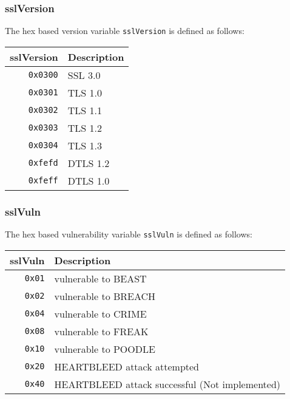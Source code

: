 \documentclass[documentation]{subfiles}
\begin{document}
\subsubsection{sslVersion}\label{sslVersion}
The hex based version variable {\tt sslVersion} is defined as follows:
\begin{longtable}{rl}
    \toprule
    {\bf sslVersion} & {\bf Description} \\
    \midrule\endhead%
    {\tt 0x0300} & SSL 3.0\\
    {\tt 0x0301} & TLS 1.0\\
    {\tt 0x0302} & TLS 1.1\\
    {\tt 0x0303} & TLS 1.2\\
    {\tt 0x0304} & TLS 1.3\\
    {\tt 0xfefd} & DTLS 1.2\\
    {\tt 0xfeff} & DTLS 1.0\\
    \bottomrule
\end{longtable}

\subsubsection{sslVuln}\label{sslVuln}
The hex based vulnerability variable {\tt sslVuln} is defined as follows:
\begin{longtable}{rl}
    \toprule
    {\bf sslVuln} & {\bf Description} \\
    \midrule\endhead%
    {\tt 0x01} & vulnerable to BEAST\\
    {\tt 0x02} & vulnerable to BREACH\\
    {\tt 0x04} & vulnerable to CRIME\\
    {\tt 0x08} & vulnerable to FREAK\\
    {\tt 0x10} & vulnerable to POODLE\\
    {\tt 0x20} & HEARTBLEED attack attempted\\
    {\tt 0x40} & HEARTBLEED attack successful (Not implemented)\\
    \bottomrule
\end{longtable}
\end{document}
